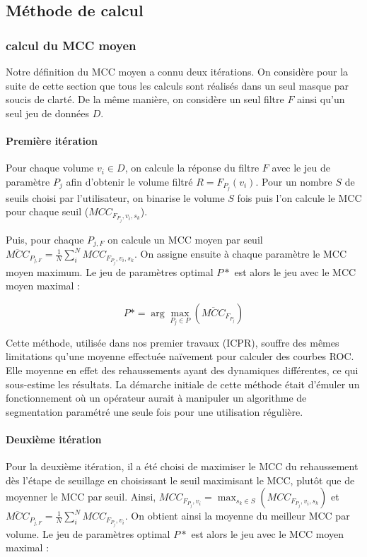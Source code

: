 \subsection{Méthode de calcul}
\subsubsection{calcul du MCC moyen}

  Notre définition du MCC moyen a connu deux itérations. On considère pour la suite de cette section que tous les calculs sont réalisés dans un seul masque par soucis de clarté. De la même manière, on considère un seul filtre $F$ ainsi qu'un seul jeu de données $D$.

  \paragraph{Première itération}
  Pour chaque volume $v_i \in D$, on calcule la réponse du filtre $F$ avec le jeu de paramètre $P_j$ afin d'obtenir le volume filtré $R = F_{P_j}(v_i)$. Pour un nombre $S$ de seuils choisi par l'utilisateur, on binarise le volume $S$ fois puis l'on calcule le MCC pour chaque seuil ($MCC_{F_{P_j},v_i,s_k}$).
  
  Puis, pour chaque $P_{j,F}$ on calcule un MCC moyen par seuil $\overline{MCC}_{ P_{j,F} } =  \frac{1}{N} \sum_{i}^N MCC_{F_{P_j},v_i,s_k}$. On assigne ensuite à chaque paramètre le MCC moyen maximum. Le jeu de paramètres optimal $P*$ est alors le jeu avec le MCC moyen maximal :
  
  \begin{equation}
    P* =  \arg\max_ {P_j \in P}( \overline{MCC}_{ F_{P_j} } )
  \end{equation}

  Cette méthode, utilisée dans nos premier travaux (ICPR), souffre des mêmes limitations qu'une moyenne effectuée naïvement pour calculer des courbes ROC. Elle moyenne en effet des rehaussements ayant des dynamiques différentes, ce qui sous-estime les résultats. La démarche initiale de cette méthode était d'émuler un fonctionnement où un opérateur aurait à manipuler un algorithme de segmentation paramétré une seule fois pour une utilisation régulière.
  
  \paragraph{Deuxième itération}
  Pour la deuxième itération, il a été choisi de maximiser le MCC du rehaussement dès l'étape de seuillage en choisissant le seuil maximisant le MCC, plutôt que de moyenner le MCC par seuil. Ainsi, $MCC_{F_{P_j},v_i} = \max_{s_k \in S} ( MCC_{F_{P_j},v_i,s_k} ) $ et  $\overline{MCC}_{ P_{j,F} } =  \frac{1}{N} \sum_{i}^N MCC_{F_{P_j},v_i} $. On obtient ainsi la moyenne du meilleur MCC par volume. Le jeu de paramètres optimal $P*$ est alors le jeu avec le MCC moyen maximal :
  

